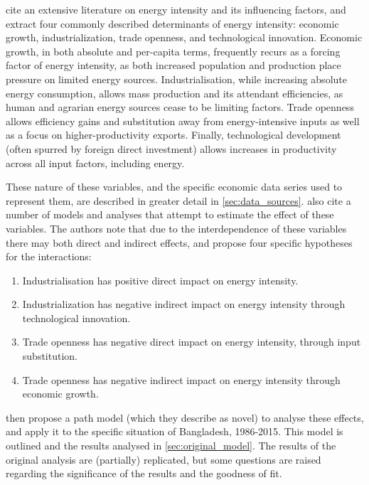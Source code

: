 \documentclass[11pt,a4paper]{article}
\begin{document}
\cite{panHowIndustrializationTrade2019} cite an extensive literature on energy intensity and its influencing factors, and extract four commonly described determinants of energy intensity: economic growth, industrialization, trade openness, and technological innovation.
Economic growth, in both absolute and per-capita terms, frequently recurs as a forcing factor of energy intensity, as both increased population and production place pressure on limited energy sources.
Industrialisation, while increasing absolute energy consumption, allows mass production and its attendant efficiencies, as human and agrarian energy sources cease to be limiting factors.
Trade openness allows efficiency gains and substitution away from energy-intensive inputs as well as a focus on higher-productivity exports. 
Finally, technological development (often spurred by foreign direct investment) allows increases in productivity across all input factors, including energy.

These nature of these variables, and the specific economic data series used to represent them, are described in greater detail in \cref{sec:data_sources}.
\cite{panHowIndustrializationTrade2019} also cite a number of models and analyses that attempt to estimate the effect of these variables. 
The authors note that due to the interdependence of these variables there may both direct and indirect effects, and propose four specific hypotheses for the interactions:
\begin{enumerate}[label=\textbf{H.\arabic*}]
\item Industrialisation has positive direct impact on energy intensity. 
\item Industrialization has negative indirect impact on energy intensity through technological innovation.
\item Trade openness has negative direct impact on energy intensity, through input substitution.
\item Trade openness has negative indirect impact on energy intensity through economic growth.
\end{enumerate}

\cite{panHowIndustrializationTrade2019} then propose a path model (which they describe as novel) to analyse these effects, and apply it to the specific situation of Bangladesh, 1986-2015.
This model is outlined and the results analysed in \cref{sec:original_model}.
The results of the original analysis are (partially) replicated, but some questions are raised regarding the significance of the results and the goodness of fit.
\end{document}
